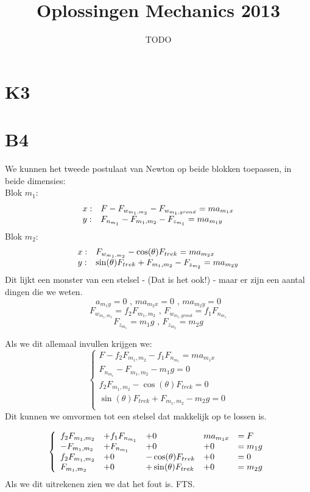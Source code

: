 \documentclass[10pt,a4paper]{article}
\title{Oplossingen Mechanics 2013}
\author{TODO}
\begin{document}
\maketitle
\pagebreak
\tableofcontents
\pagebreak

\section*{K3}
\section*{B4}
We kunnen het tweede postulaat van Newton op beide blokken toepassen, in beide dimensies:\\
Blok $m_1$:
\[
\begin{array}{l l}
x: & F - F_{w_{m_1,m_2}} - F_{w_{m_1,grond}} = m a_{m_1x}\\
y: & F_{n_{m_1}} -F_{m_1,m_2} - F_{z_{m_1}} = m a_{m_1y}\\
\end{array}
\]
Blok $m_2$:
\[
\begin{array}{l l}
x: & F_{w_{m_1,m_2}} - \cos(\theta)F_{trek} = m a_{m_2x}\\
y: & \sin(\theta)F_{trek} + F_{m_1,m_2} - F_{z_{m_2}} = m a_{m_2y}\\
\end{array}
\]
Dit lijkt een monster van een stelsel - (Dat is het ook!) - maar er zijn een aantal dingen die we weten.
\[
a_{m_1y} = 0 \text{ ,  } m a_{m_2x}=0 \text{ ,  }  m a_{m_2y}=0
\]
\[
F_{w_{m_1,m_2}} = f_2 F_{m_1,m_2} \text{ ,  }F_{w_{m_1,grond}} = f_1 F_{n_{m_1}}
\]
\[
F_{z_{m_1}} = m_1 g \text{ ,  } F_{z_{m_2}} = m_2 g
\]

Als we dit allemaal invullen krijgen we:
\[
\left\lbrace
\begin{array}{l}
F - f_2 F_{m_1,m_2} - f_1 F_{n_{m_1}} = m a_{m_1x}\\
F_{n_{m_1}} - F_{m_1,m_2} -  m_1 g  = 0\\
f_2 F_{m_1,m_2} - \cos(\theta)F_{trek} = 0\\
\sin(\theta)F_{trek} + F_{m_1,m_2} - m_2 g = 0\\
\end{array}
\right.
\]
Dit kunnen we omvormen tot een stelsel dat makkelijk op te lossen is.

\[
\left\lbrace
\begin{array}{l l l l l}
f_2 F_{m_1,m_2} &+ f_1 F_{n_{m_1}} &+ 0 & m a_{m_1x} &=F\\
- F_{m_1,m_2} &+ F_{n_{m_1}}  &+ 0 &+ 0 &= m_1 g\\
f_2 F_{m_1,m_2} &+ 0 &- \cos(\theta)F_{trek} &+ 0 &= 0\\
F_{m_1,m_2} &+ 0 &+\sin(\theta)F_{trek} &+ 0 &= m_2 g\\
\end{array}
\right.
\]
Als we dit uitrekenen zien we dat het fout is. FTS.
\end{document}
